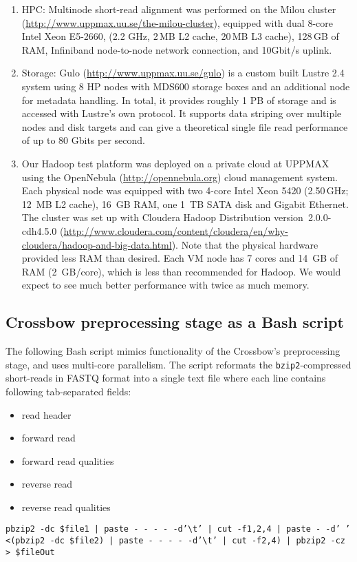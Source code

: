 \documentclass[11pt]{article}
\begin{document}
\begin{enumerate}

\item 
HPC:
Multinode short-read alignment was performed on the Milou cluster (\url{http://www.uppmax.uu.se/the-milou-cluster}), equipped with dual 8-core Intel Xeon E5-2660, (2.2 GHz, 2\,MB L2 cache, 20\,MB L3 cache), 128\,GB of RAM, Infiniband node-to-node network connection, and 10Gbit/s uplink.

\item Storage: 
Gulo (\url{http://www.uppmax.uu.se/gulo}) is a custom built Lustre 2.4 system using 8 HP nodes with MDS600
storage boxes and an additional node for metadata handling. In total, it
provides roughly 1 PB of storage and is accessed with Lustre's own protocol. It
supports data striping over multiple nodes and disk targets and can give a
theoretical single file read performance of up to 80 Gbits per second.

\item Our Hadoop test platform was deployed on a private cloud at UPPMAX using
	the OpenNebula (\url{http://opennebula.org}) cloud management system. Each physical node
	was equipped with two 4-core Intel Xeon 5420 (2.50\,GHz; 12~MB L2 cache),
	16~GB RAM, one 1~TB SATA disk and Gigabit Ethernet. The cluster was set up
	with Cloudera Hadoop Distribution version~2.0.0-cdh4.5.0 (\url{http://www.cloudera.com/content/cloudera/en/why-cloudera/hadoop-and-big-data.html}).
	Note that the physical hardware provided less RAM than desired. Each VM node
	has 7 cores and 14~GB of RAM (2~GB/core), which is less than recommended for
	Hadoop. We would expect to see much better performance with twice as much memory.
\end{enumerate}


\subsection*{Crossbow preprocessing stage as a Bash script}

The following Bash script mimics functionality of the Crossbow's preprocessing stage,
and uses multi-core parallelism. The script reformats the
\texttt{bzip2}-compressed short-reads in FASTQ format into a single text file
where each line contains following tab-separated fields:
\begin{itemize}
\item read header
\item forward read
\item forward read qualities
\item reverse read
\item reverse read qualities
\end{itemize}


\texttt {pbzip2 -dc  \${file1} | paste - - - - -d'\textbackslash t' | cut -f1,2,4 | paste - -d' ' <(pbzip2 -dc \${file2}) 
| paste - - - - -d'\textbackslash t' | cut -f2,4) | pbzip2 -cz > \${fileOut}}
\end{document}
